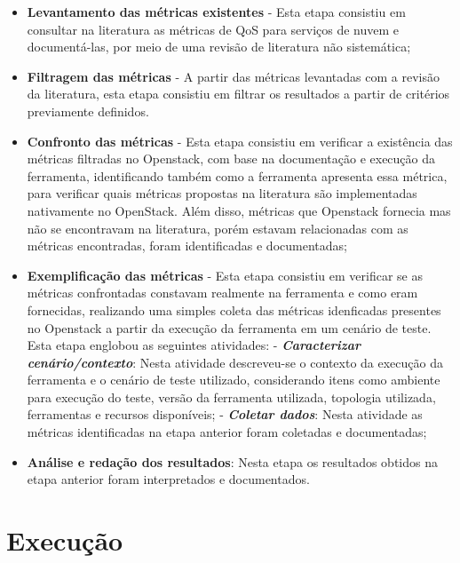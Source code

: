 \documentclass[conference]{IEEEtran}
\begin{document}
\begin{itemize}
 \item \textbf{Levantamento das métricas existentes} - Esta etapa consistiu em consultar na literatura as métricas de QoS para
	serviços de nuvem e documentá-las, por meio de uma revisão de literatura não sistemática;

 \item \textbf{Filtragem das métricas} - A partir das métricas levantadas com a revisão da literatura, esta etapa consistiu em 
	filtrar os resultados a partir de critérios previamente definidos.
	
 \item \textbf{Confronto das métricas} - Esta etapa consistiu em verificar a existência das métricas filtradas no Openstack,	
	com base na documentação e execução da ferramenta, identificando também como a ferramenta apresenta essa métrica,
	para verificar quais métricas propostas na literatura são implementadas nativamente no OpenStack. Além disso,
	métricas que Openstack fornecia mas não se encontravam na literatura, porém estavam relacionadas com as métricas encontradas,
	foram identificadas e documentadas;
 
 \item \textbf{Exemplificação das métricas} - Esta etapa consistiu em verificar se as métricas confrontadas constavam realmente na ferramenta e
	como eram fornecidas,
	realizando uma simples coleta das métricas idenficadas presentes no Openstack a partir da execução da ferramenta em um cenário de teste.
	Esta etapa englobou as seguintes atividades:
	\subitem - \emph{\textbf{Caracterizar cenário/contexto}}: Nesta atividade descreveu-se o contexto da execução da ferramenta e o cenário de teste utilizado,
		 considerando itens como ambiente para execução do teste, versão da ferramenta utilizada, topologia utilizada, ferramentas
		 e recursos disponíveis;
	\subitem - \emph{\textbf{Coletar dados}}: Nesta atividade as métricas identificadas na etapa anterior foram coletadas e documentadas;

 \item \textbf{Análise e redação dos resultados}: Nesta etapa os resultados obtidos na etapa anterior foram interpretados e documentados.
\end{itemize}

\section{Execução} %
\end{document}
